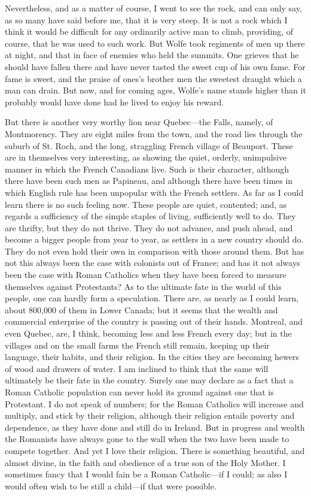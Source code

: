 Nevertheless, and as a matter of course, I went to see the rock,
and can only say, as so many have said before me, that it is very
steep.  It is not a rock which I think it would be difficult for
any ordinarily active man to climb, providing, of course, that he
was used to such work.  But Wolfe took regiments of men up there at
night, and that in face of enemies who held the summits.  One
grieves that he should have fallen there and have never tasted the
sweet cup of his own fame.  For fame is sweet, and the praise of
ones's brother men the sweetest draught which a man can drain.  But
now, and for coming ages, Wolfe's name stands higher than it
probably would have done had he lived to enjoy his reward.

But there is another very worthy lion near Quebec---the Falls,
namely, of Montmorency.  They are eight miles from the town, and
the road lies through the suburb of St. Roch, and the long,
straggling French village of Beauport.  These are in themselves
very interesting, as showing the quiet, orderly, unimpulsive manner
in which the French Canadians live.  Such is their character,
although there have been such men as Papineau, and although there
have been times in which English rule has been unpopular with the
French settlers.  As far as I could learn there is no such feeling
now.  These people are quiet, contented; and, as regards a
sufficiency of the simple staples of living, sufficiently well to
do.  They are thrifty, but they do not thrive.  They do not
advance, and push ahead, and become a bigger people from year to
year, as settlers in a new country should do.  They do not even
hold their own in comparison with those around them.  But has not
this always been the case with colonists out of France; and has it
not always been the case with Roman Catholics when they have been
forced to measure themselves against Protestants?  As to the
ultimate fate in the world of this people, one can hardly form a
speculation.  There are, as nearly as I could learn, about 800,000
of them in Lower Canada; but it seems that the wealth and
commercial enterprise of the country is passing out of their hands.
Montreal, and even Quebec, are, I think, becoming less and less
French every day; but in the villages and on the small farms the
French still remain, keeping up their language, their habits, and
their religion.  In the cities they are becoming hewers of wood and
drawers of water.  I am inclined to think that the same will
ultimately be their fate in the country.  Surely one may declare as
a fact that a Roman Catholic population can never hold its ground
against one that is Protestant.  I do not speak of numbers; for the
Roman Catholics will increase and multiply, and stick by their
religion, although their religion entails poverty and dependence,
as they have done and still do in Ireland.  But in progress and
wealth the Romanists have always gone to the wall when the two have
been made to compete together.  And yet I love their religion.
There is something beautiful, and almost divine, in the faith and
obedience of a true son of the Holy Mother.  I sometimes fancy that
I would fain be a Roman Catholic---if I could; as also I would often
wish to be still a child---if that were possible.

